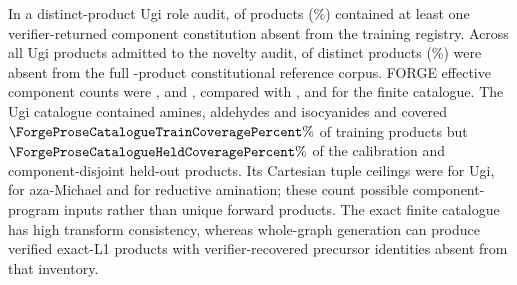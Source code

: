 \documentclass{article}
\begin{document}
In a distinct-product Ugi role audit, \ForgeOffRegistryCount{} of
\ForgeOffRegistryDenominator{} products (\ForgeOffRegistryPercent\%) contained at least one
verifier-returned component constitution absent from the training registry. Across all Ugi products
admitted to the novelty audit, \ForgeNovelAgainstFullCount{} of
\ForgeNovelAgainstFullDenominator{} distinct products (\ForgeNovelAgainstFullPercent\%) were absent
from the full \ForgeProseFullReferenceSize{}-product constitutional reference corpus. FORGE effective
component counts were \ForgeProseCatalogueForgeUgiEffectiveComponentCount{},
\ForgeProseCatalogueForgeBLEffectiveComponentCount{} and
\ForgeProseCatalogueForgeLXEffectiveComponentCount{}, compared with
\ForgeProseCatalogueCatalogueUgiEffectiveComponentCount{},
\ForgeProseCatalogueCatalogueBLEffectiveComponentCount{} and
\ForgeProseCatalogueCatalogueLXEffectiveComponentCount{} for the finite catalogue. The Ugi catalogue
contained \ForgeProseCatalogueUgiAmineCount{} amines,
\ForgeProseCatalogueUgiAldehydeCount{} aldehydes and
\ForgeProseCatalogueUgiIsocyanideCount{} isocyanides and covered
$\ForgeProseCatalogueTrainCoveragePercent\%$ of training products but
$\ForgeProseCatalogueHeldCoveragePercent\%$ of the calibration and component-disjoint held-out
products. Its Cartesian tuple ceilings were \ForgeProseCatalogueUgiTupleCeiling{} for Ugi,
\ForgeProseCatalogueBLTupleCeiling{} for aza-Michael and
\ForgeProseCatalogueLXTupleCeiling{} for reductive amination; these count possible
component-program inputs rather than unique forward products. The exact finite catalogue has high
transform consistency, whereas whole-graph generation can produce verified exact-L1 products with
verifier-recovered precursor identities absent from that inventory.

\begin{table}[H]
\caption{\textbf{Whole-graph generation versus a finite-component assembler.}
Verified exact-L1, distinct exact-L1 and verifier-recovered component-novel yields are reported per
1,000 generation attempts. A component-novel product has exactly one verifier-returned exact-L1
decomposition and contains at least one component constitution absent from the training catalogue.
This verifier-relative metric is not strong catalogue escape because complete catalogue-product
reachability was not computed. The catalogue has zero input-component novelty by construction, but may
achieve higher raw validity or exact-L1 yield. FORGE-minus-catalogue contrasts use the three seeds
as descriptive paired units; no three-seed confidence interval is inferred.}
\label{tab:catalogue-comparison}
\centering
\scriptsize
\setlength{\tabcolsep}{4pt}
\end{table}
\end{document}
